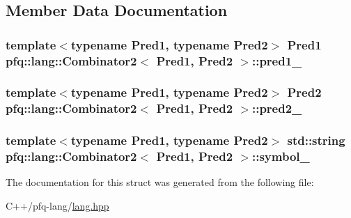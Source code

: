 \subsection{Member Data Documentation}
\hypertarget{structpfq_1_1lang_1_1Combinator2_ac7a495da4c57d15afb914409014545cd}{
\subsubsection[{pred1\+\_\+}]{\setlength{\rightskip}{0pt plus 5cm}template$<$typename Pred1, typename Pred2$>$ Pred1 {\bf pfq\+::lang\+::\+Combinator2}$<$ Pred1, Pred2 $>$\+::pred1\+\_\+}}\label{structpfq_1_1lang_1_1Combinator2_ac7a495da4c57d15afb914409014545cd}
\hypertarget{structpfq_1_1lang_1_1Combinator2_a464bfd07f446f9f580d7088c75c2dbe2}{
\subsubsection[{pred2\+\_\+}]{\setlength{\rightskip}{0pt plus 5cm}template$<$typename Pred1, typename Pred2$>$ Pred2 {\bf pfq\+::lang\+::\+Combinator2}$<$ Pred1, Pred2 $>$\+::pred2\+\_\+}}\label{structpfq_1_1lang_1_1Combinator2_a464bfd07f446f9f580d7088c75c2dbe2}
\hypertarget{structpfq_1_1lang_1_1Combinator2_ab0b5061995f01bcc5826bb62d5fa0b99}{
\subsubsection[{symbol\+\_\+}]{\setlength{\rightskip}{0pt plus 5cm}template$<$typename Pred1, typename Pred2$>$ std\+::string {\bf pfq\+::lang\+::\+Combinator2}$<$ Pred1, Pred2 $>$\+::symbol\+\_\+}}\label{structpfq_1_1lang_1_1Combinator2_ab0b5061995f01bcc5826bb62d5fa0b99}


The documentation for this struct was generated from the following file\+:\begin{DoxyCompactItemize}
\item 
C++/pfq-\/lang/\hyperlink{lang_8hpp}{lang.\+hpp}\end{DoxyCompactItemize}
